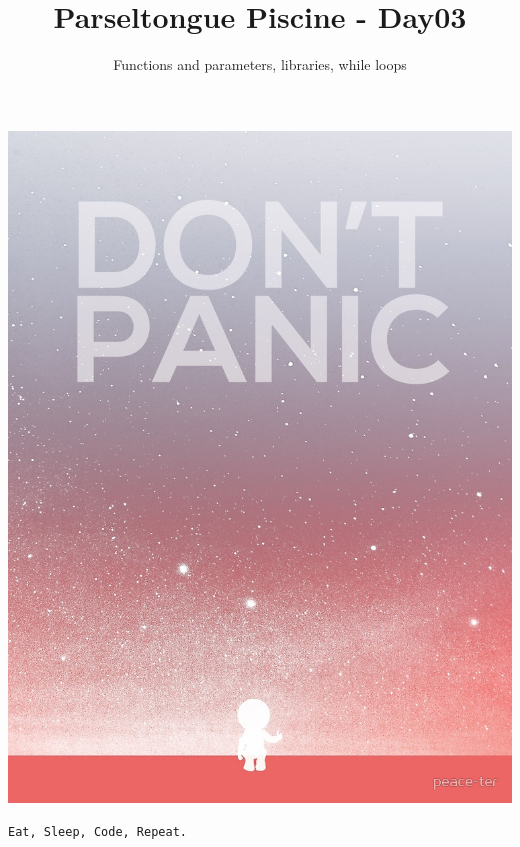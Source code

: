 \documentclass{42-en}
\begin{document}
\title{Parseltongue Piscine - Day03}
\subtitle{Functions and parameters, libraries, while loops}


\maketitle

\tableofcontents


\newpage

\bigskip

\centerline{\includegraphics[width=150mm]{images/dont_panic.jpeg}}

\centerline{\texttt{Eat, Sleep, Code, Repeat.}}

\end{document}
